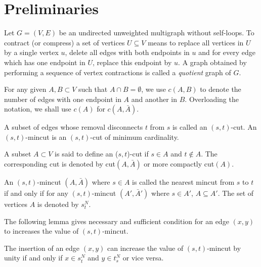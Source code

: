 \chapter{Preliminaries}



Let $G=(V,E)$ be an undirected unweighted multigraph without self-loops. To contract (or compress) a set of vertices $U\subseteq V$ means to replace all vertices in $U$ by a single vertex $u$, delete all edges with both endpoints in $u$ and for every edge which has one endpoint in $U$, replace this endpoint by $u$. A graph obtained by performing a sequence of vertex contractions is called a {\em quotient} graph of $G$.


For any given $A,B\subset V$ such that $A\cap B=\emptyset$, we use $c(A,B)$ to denote the number of edges with one endpoint in $A$
and another in $B$. Overloading the notation, we shall use $c(A)$ for $c(A,\bar{A})$.

\begin{definition}[$(s,t)$-cut]
A subset of edges whose removal disconnects $t$ from $s$ is called an $(s,t)$-cut. An $(s,t)$-mincut is an $(s,t)$-cut of minimum cardinality. 
\label{def:(u,v)-cut}
\end{definition}

\begin{definition}
A subset $A\subset V$ is said to define an ($s,t$)-cut if $s\in A$ and $t\notin A$. The corresponding cut is denoted by cut$(A,\bar{A})$ or more compactly cut$(A)$.  
\label{def:set-definiting-a-cut}
\end{definition}

\begin{definition}
An $(s,t)$-mincut $(A,{\bar A})$ where $s\in A$ is called the nearest mincut from $s$ to $t$ if and only if for any $(s,t)$-mincut $(A',{\bar A'})$ where $s \in A'$, $A\subseteq A'$. The set of vertices $A$ is denoted by $s_t^N$.
\label{def:nearest-s-t-mincut}
\end{definition}


The following lemma gives necessary and sufficient condition for an edge $(x,y)$ to increases the value of $(s,t)$-mincut.

\begin{lemma}
The insertion of an edge $(x, y)$ can increase the
value of $(s,t)$-mincut by unity if and only if $x\in s_t^N$ and $y\in t_s^N$ or vice versa.
\label{lem:edge-insertion-increases-mincut}
\end{lemma}

